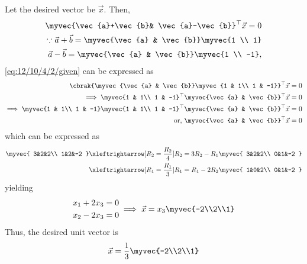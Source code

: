 Let the desired vector be $\vec{x}$.  Then, 
\begin{align} 
\myvec{\vec{a}+\vec{b}& \vec{a}-\vec{b}}^\top\vec{x}=0
	\label{eq:12/10/4/2/given}
	\\
	\because 
	\vec{a}+\vec{b}= \myvec{\vec{a} & \vec{b}}\myvec{1 \\ 1}
	\\
	\vec{a} - \vec{b}= \myvec{\vec{a} & \vec{b}}\myvec{1 \\ -1}, 
\end{align}
	\eqref{eq:12/10/4/2/given}
	can be expressed as 
\begin{align}
	\cbrak{\myvec{\vec{a} & \vec{b}}\myvec{1 & 1\\ 1 & -1}}^\top\vec{x}=0\\
\implies 	\myvec{1 & 1\\ 1 & -1}^\top\myvec{\vec{a} & \vec{b}}^\top\vec{x}=0
\\
\implies 	\myvec{1 & 1\\ 1 & -1}\myvec{1 & 1\\ 1 & -1}^\top\myvec{\vec{a} & \vec{b}}^\top\vec{x}=0
\\
	\text{or, }
\myvec{\vec{a} & \vec{b}}^\top\vec{x}=0
\end{align}
which can be expressed as 
\begin{align} 
\myvec{
3&2&2\\
1&2&-2
}
	\xleftrightarrow[R_2 = \frac{R_2}{4}]{R_2=3R_2-R_1}
\myvec{
3&2&2\\
0&1&-2
	}
	\\
	\xleftrightarrow[R_1 = \frac{R_1}{3}]{R_1=R_1 - 2R_2}
\myvec{
1&0&2\\
0&1&-2
}
\end{align}
yielding
\begin{align}
\begin{split}
x_1+2x_3=0\\
x_2-2x_3=0
\end{split}
\implies 
\vec{x}
=x_3\myvec{-2\\2\\1}
\end{align}
Thus, the desired unit vector  is 
\begin{align}
\vec{x}
	=\frac{1}{3}\myvec{-2\\2\\1}
\end{align}
